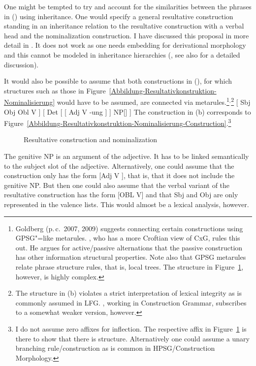 One might be tempted to try and account for the similarities between the phrases in () using
inheritance. One would specify a general resultative construction standing in an inheritance relation
to the resultative construction with a verbal head and the nominalization construction. I have discussed this proposal in more detail in
. It does not work as one needs embedding for derivational morphology and this cannot be modeled
in inheritance hierarchies (, see also  for a detailed discussion).

It would also be possible to assume that both constructions  in (), for which structures such as those in
Figure~\ref{Abbildung-Resultativkonstruktion-Nominalisierung} would have to be assumed, are connected via metarules.\footnote{
  Goldberg (p.\,c.\ 2007, 2009) suggests connecting certain constructions using GPSG"=like metarules.
  \citet[]{Deppermann2006a}, who has a more Croftian view of CxG, rules this out.
 He argues for active/passive alternations that the passive construction has other information
structural properties.  Note also that GPSG metarules relate phrase
structure rules, that is, local trees. The structure in
Figure~\ref{Abbildung-Resultativkonstruktion-Nominalisierung-Construction}, however, is highly complex.
}$^,$\footnote{
  The structure in (b) violates a strict interpretation of lexical integrity as is commonly assumed in
  LFG\indexlfg. \citet{Booij2005a,Booij2009a}, working in Construction Grammar\indexcxg, subscribes to a somewhat
  weaker version, however.%
}
\eal
\ex {}[ Sbj Obj Obl V ]
\ex {}[ Det [ [ Adj V -ung ] ] NP[] ]
\zl
\addlines
The construction in (b) corresponds to
Figure~\vref{Abbildung-Resultativkonstruktion-Nominalisierung-Construction}.\footnote{
  I do not assume zero affixes for inflection. The respective affix in
  Figure~\ref{Abbildung-Resultativkonstruktion-Nominalisierung-Construction} is there to show that
  there is structure. Alternatively one could assume a unary branching rule/construction as is
  common in HPSG/Construction Morphology.
}
\begin{figure}
\centering
{}
\caption{\label{Abbildung-Resultativkonstruktion-Nominalisierung-Construction}Resultative construction and nominalization}
\end{figure}%
The genitive NP is an argument of the adjective. It has to be linked semantically to the subject slot of the adjective.
Alternatively, one could assume that the construction only has the form [Adj V ], that
is, that it does not include the genitive NP. But then one could also assume that the verbal variant
of the resultative construction has the form [OBL V] and that Sbj and Obj are only represented in
the valence lists. This would almost be a lexical analysis, however.

